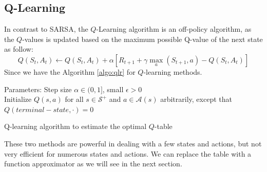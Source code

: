 \subsection{Q-Learning}
In contrast to SARSA, the $Q$-Learning algorithm is an off-policy algorithm, as the $Q$-values is updated based on the maximum possible Q-value of the next state as follow:
\begin{equation}\label{eq:qlr}
	Q(S_t, A_t)\leftarrow Q(S_t, A_t) + \alpha[R_{t+1} + \gamma\max_a (S_{t+1}, a) - Q(S_t, A_t)]
\end{equation}
Since we have the Algorithm \ref{algo:qlr} for $Q$-learning methods.
\begin{algorithm}
	Parameters: Step size $\alpha\in(0,1]$, small $\epsilon>0$\\
	Initialize $Q(s,a)$ for all $s\in\mathcal{S}^{+}$ and $a\in\mathcal{A}(s)$ arbitrarily, except that $Q(terminal-state, \cdot)=0$\\
	\caption{Q-learning algorithm to estimate the optimal $Q$-table}
	\label{algo:qlr}
\end{algorithm}



These two methods are powerful in dealing with a few states and actions, but not very efficient for numerous states and actions. We can replace the table with a function approximator as we will see in the next section.



